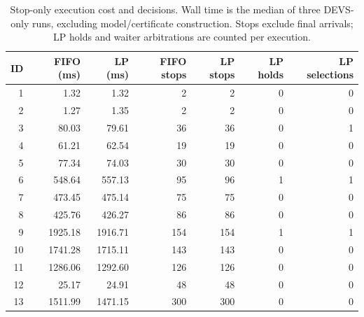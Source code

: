 \begin{table}[htbp]
\centering\small
\setlength{\tabcolsep}{4pt}
\caption{Stop-only execution cost and decisions. Wall time is the median of three DEVS-only runs, excluding model/certificate construction. Stops exclude final arrivals; LP holds and waiter arbitrations are counted per execution.}
\label{tab:stop-baseline-runtime}
\begin{tabular}{rrrrrrr}
\toprule
ID & FIFO (ms) & LP (ms) & FIFO stops & LP stops & LP holds & LP selections\\
\midrule
1 & 1.32 & 1.32 & 2 & 2 & 0 & 0\\
2 & 1.27 & 1.35 & 2 & 2 & 0 & 0\\
3 & 80.03 & 79.61 & 36 & 36 & 0 & 1\\
4 & 61.21 & 62.54 & 19 & 19 & 0 & 0\\
5 & 77.34 & 74.03 & 30 & 30 & 0 & 0\\
6 & 548.64 & 557.13 & 95 & 96 & 1 & 1\\
7 & 473.45 & 475.14 & 75 & 75 & 0 & 0\\
8 & 425.76 & 426.27 & 86 & 86 & 0 & 0\\
9 & 1925.18 & 1916.71 & 154 & 154 & 1 & 1\\
10 & 1741.28 & 1715.11 & 143 & 143 & 0 & 0\\
11 & 1286.06 & 1292.60 & 126 & 126 & 0 & 0\\
12 & 25.17 & 24.91 & 48 & 48 & 0 & 0\\
13 & 1511.99 & 1471.15 & 300 & 300 & 0 & 0\\
\bottomrule
\end{tabular}
\end{table}

